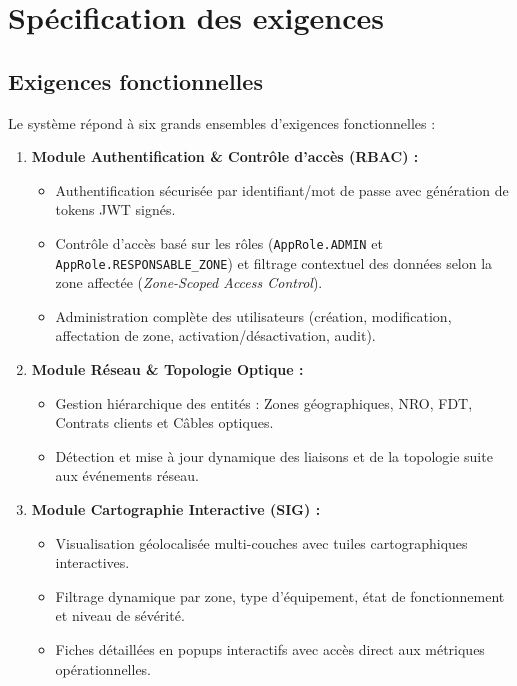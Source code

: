 \section{Sp\'ecification des exigences}

\subsection{Exigences fonctionnelles}
Le syst\`eme r\'epond \`a six grands ensembles d'exigences fonctionnelles :

\begin{enumerate}
    \item \textbf{Module Authentification \& Contr\^ole d'acc\`es (RBAC) :}
    \begin{itemize}
        \item Authentification s\'ecuris\'ee par identifiant/mot de passe avec g\'en\'eration de tokens JWT sign\'es.
        \item Contr\^ole d'acc\`es bas\'e sur les r\^oles (\texttt{AppRole.ADMIN} et \texttt{AppRole.RESPONSABLE\_ZONE}) et filtrage contextuel des donn\'ees selon la zone affect\'ee (\textit{Zone-Scoped Access Control}).
        \item Administration compl\`ete des utilisateurs (cr\'eation, modification, affectation de zone, activation/d\'esactivation, audit).
    \end{itemize}

    \item \textbf{Module R\'eseau \& Topologie Optique :}
    \begin{itemize}
        \item Gestion hi\'erarchique des entit\'es : Zones g\'eographiques, NRO, FDT, Contrats clients et C\^ables optiques.
        \item D\'etection et mise \`a jour dynamique des liaisons et de la topologie suite aux \'ev\'enements r\'eseau.
    \end{itemize}

    \item \textbf{Module Cartographie Interactive (SIG) :}
    \begin{itemize}
        \item Visualisation g\'eolocalis\'ee multi-couches avec tuiles cartographiques interactives.
        \item Filtrage dynamique par zone, type d'\'equipement, \'etat de fonctionnement et niveau de s\'ev\'erit\'e.
        \item Fiches d\'etaill\'ees en popups interactifs avec acc\`es direct aux m\'etriques op\'erationnelles.
    \end{itemize}


\end{enumerate}

